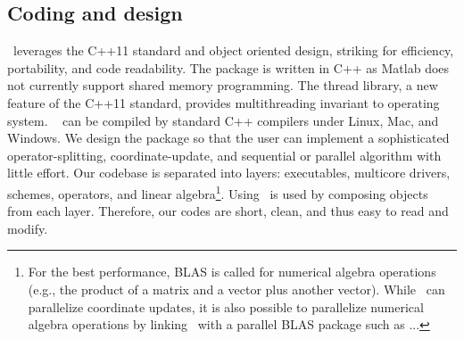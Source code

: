 \subsection{Coding and design}
\pkg~leverages the C++11 standard and object oriented design, striking for efficiency, portability, and code readability. The package is written in C++ as Matlab does not currently support shared memory programming. The thread library, a new feature of the C++11 standard, provides multithreading invariant to operating system. \pkg~ can be compiled by standard C++ compilers  under Linux, Mac, and Windows. We design the package so that the user can implement a sophisticated operator-splitting, coordinate-update, and sequential or parallel algorithm  with little effort. Our codebase is separated into layers: executables, multicore drivers, schemes, operators, and linear algebra\footnote{For the best performance, BLAS is called for numerical algebra operations (e.g., the product of a matrix and a vector plus another vector). While \pkg~can parallelize coordinate updates, it is also possible to parallelize numerical algebra operations by linking \pkg~with a parallel BLAS package such as ...}.  Using \pkg~is used by composing objects from each layer. 
Therefore, our codes  are short, clean, and thus easy to read and modify. 



 
